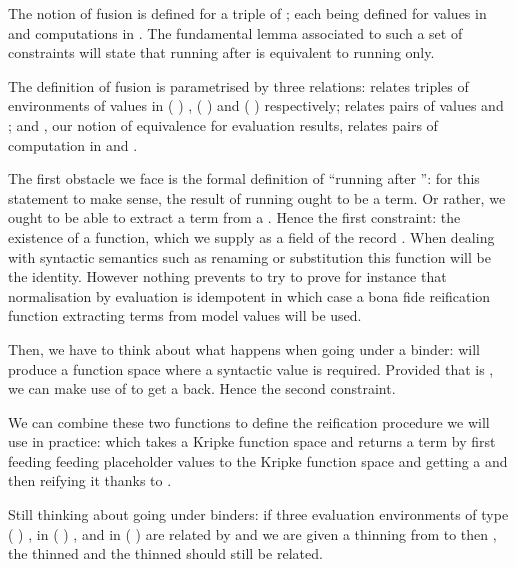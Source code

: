 The notion of fusion is defined for a triple of ; each 
being defined for values in  and computations in . The
fundamental lemma associated to such a set of constraints will state that
running  after  is equivalent to running  only.

The definition of fusion is parametrised by three relations:  relates
triples of environments of values in {( )  },
{( )  } and {( )  }
respectively;  relates pairs of values  and ;
and , our notion of equivalence for evaluation results, relates pairs
of computation in  and .


The first obstacle we face is the formal definition of ``running 
after '': for this statement to make sense, the result of running
 ought to be a term. Or rather, we ought to be able to extract a
term from a . Hence the first constraint: the existence of a
 function, which we supply as a field of the record .
When dealing with syntactic semantics such as renaming or substitution
this function will be the identity. However nothing prevents to try to prove for
instance that normalisation by evaluation is idempotent in which case a bona fide
reification function extracting terms from model values will be used.


Then, we have to think about what happens when going under a binder: 
will produce a  function space where a syntactic value is required.
Provided that  is , we can make use of  to get a
 back. Hence the second constraint.


We can combine these two functions to define the reification procedure we will
use in practice:  which takes a Kripke function space and returns a
term by first feeding feeding placeholder values to the Kripke function space
and getting a  and then reifying it thanks to .


Still thinking about going under binders: if three evaluation environments  of
type {( )  },  in {( )  },
and  in {( )  } are related by  and we are
given a thinning  from  to  then , the thinned  and the
thinned  should still be related.

